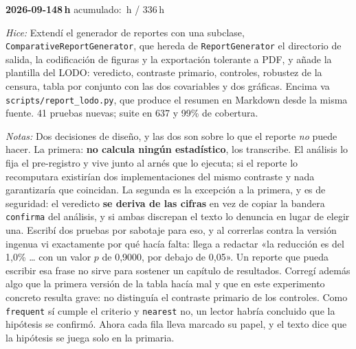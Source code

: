 \documentclass[11pt,letterpaper]{article}
\newcommand{\presupuesto}{336}
\newcommand{\horasacum}{0}
\newcommand{\entrada}[4]{%
  \xdef\horasacum{\fpeval{\horasacum + #2}}%
  \par\medskip
  \noindent\textbf{\color{tecnavy}#1}\quad\textbf{#2\,h}%
  \hfill{\small\color{gris}acumulado: \horasacum\,h / \presupuesto\,h}\par
  \nopagebreak
  \noindent\textit{Hice:} #3\par
  \nopagebreak
  \noindent\textit{Notas:} #4\par
}
\begin{document}
\entrada{2026-09-14}{8}
{Extendí el generador de reportes con una subclase,
 \texttt{Comparative\allowbreak Report\allowbreak Generator}, que hereda de
 \texttt{Report\allowbreak Generator} el directorio de salida, la codificación de figuras y
 la exportación tolerante a PDF, y añade la plantilla del LODO: veredicto, contraste primario,
 controles, robustez de la censura, tabla por conjunto con las dos covariables y dos
 gráficas. Encima va \texttt{scripts/report\_lodo.py}, que produce el resumen en Markdown
 desde la misma fuente. 41 pruebas nuevas; suite en 637 y 99\% de cobertura.}
{Dos decisiones de diseño, y las dos son sobre lo que el reporte \emph{no} puede hacer. La
 primera: \textbf{no calcula ningún estadístico}, los transcribe. El análisis lo fija el
 pre-registro y vive junto al arnés que lo ejecuta; si el reporte lo recomputara existirían
 dos implementaciones del mismo contraste y nada garantizaría que coincidan. La segunda es
 la excepción a la primera, y es de seguridad: el veredicto \textbf{se deriva de las
 cifras} en vez de copiar la bandera \texttt{confirma} del análisis, y si ambas discrepan el
 texto lo denuncia en lugar de elegir una. Escribí dos pruebas por sabotaje para eso, y al
 correrlas contra la versión ingenua vi exactamente por qué hacía falta: llega a redactar
 «la reducción es del 1,0\% \ldots{} con un valor $p$ de 0,9000, por debajo de 0,05». Un
 reporte que pueda escribir esa frase no sirve para sostener un capítulo de resultados.
 Corregí además algo que la primera versión de la tabla hacía mal y que en este
 experimento concreto resulta grave: no distinguía el contraste primario de los
 controles. Como \texttt{frequent} sí cumple el criterio y \texttt{nearest} no, un
 lector habría concluido que la hipótesis se confirmó. Ahora cada fila lleva marcado
 su papel, y el texto dice que la hipótesis se juega solo en la primaria.}
\end{document}
